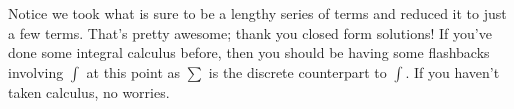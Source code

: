 \documentclass[]{tufte-handout}
\begin{document}
Notice we took what is sure to be a lengthy series of terms and reduced it to just a few terms. That's pretty awesome; thank you closed form solutions! If you've done some integral calculus before, then you should be having some flashbacks involving $\int$ at this point as $\sum$ is the discrete counterpart to $\int$.  If you haven't taken calculus, no worries. 
\end{document}
